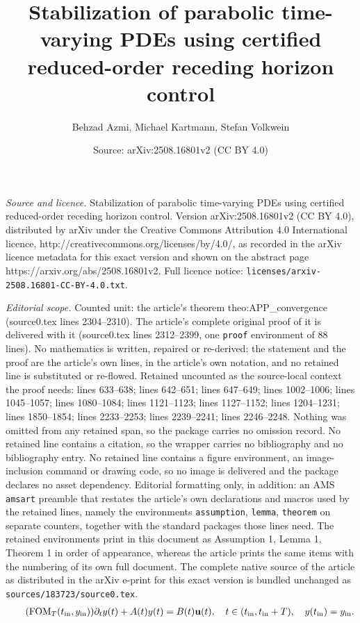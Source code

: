 \documentclass[10pt,a4paper]{amsart}
\title{Stabilization of parabolic time-varying PDEs using certified reduced-order receding horizon control}
\author{Behzad Azmi, Michael Kartmann, Stefan Volkwein}
\date{Source: arXiv:2508.16801v2 (CC BY 4.0)}
\newcommand{\bu}{\mathbf{u}}
\newcommand{\ddt}{\partial_t}
\newcommand{\tint}{t_{\mathrm{in}}}
\newcommand{\yint}{y_{\mathrm{in}}}
\begin{document}
\maketitle

\noindent\emph{Source and licence.} Stabilization of parabolic time-varying PDEs using certified reduced-order receding horizon control. Version arXiv:2508.16801v2 (CC BY 4.0), distributed by arXiv under the Creative Commons Attribution 4.0 International licence, http://creativecommons.org/licenses/by/4.0/, as recorded in the arXiv licence metadata for this exact version and shown on the abstract page https://arxiv.org/abs/2508.16801v2. Full licence notice: \texttt{licenses/arxiv-2508.16801-CC-BY-4.0.txt}.\par\smallskip

\noindent\textit{Editorial scope.} Counted unit: the article's theorem theo:APP\_convergence (source0.tex lines 2304--2310). The article's complete original proof of it is delivered with it (source0.tex lines 2312--2399, one \texttt{proof} environment of 88 lines). No mathematics is written, repaired or re-derived: the statement and the proof are the article's own lines, in the article's own notation, and no retained line is substituted or re-flowed.  Retained uncounted as the source-local context the proof needs: lines 633--638; lines 642--651; lines 647--649; lines 1002--1006; lines 1045--1057; lines 1080--1084; lines 1121--1123; lines 1127--1152; lines 1204--1231; lines 1850--1854; lines 2233--2253; lines 2239--2241; lines 2246--2248.  Nothing was omitted from any retained span, so the package carries no omission record.  No retained line contains a citation, so the wrapper carries no bibliography and no bibliography entry.  No retained line contains a figure environment, an image-inclusion command or drawing code, so no image is delivered and the package declares no asset dependency.  Editorial formatting only, in addition: an AMS \texttt{amsart} preamble that restates the article's own declarations and macros used by the retained lines, namely the environments \texttt{assumption}, \texttt{lemma}, \texttt{theorem} on separate counters, together with the standard packages those lines need.  The retained environments print in this document as Assumption 1, Lemma 1, Theorem 1 in order of appearance, whereas the article prints the same items with the numbering of its own full document.  The complete native source of the article as distributed in the arXiv e-print for this exact version is bundled unchanged as \texttt{sources/183723/source0.tex}.
\begin{align}
    \label{eq:LTV}
    \tag{$\mathrm{FOM}_T(\tint,\yint)$}
    \ddt y(t)+A(t)y(t)=B(t)\bu(t), \quad t \in  ( \tint,\tint+T),\quad y(\tint)=\yint.
\end{align}
\end{document}
